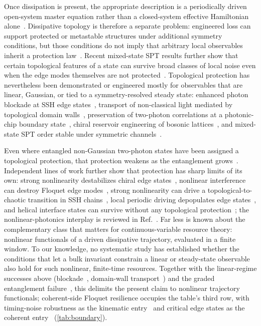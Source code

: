 \documentclass[aps,pra,preprint,superscriptaddress,amsmath,amssymb]{revtex4-2}
\begin{document}
Once dissipation is present, the appropriate description is a periodically driven open-system master equation rather than a closed-system effective Hamiltonian alone~\cite{Mori2023,Chen2024}. Dissipative topology is therefore a separate problem: engineered loss can support protected or metastable structures under additional symmetry conditions, but those conditions do not imply that arbitrary local observables inherit a protection law~\cite{Diehl2011,Bardyn2013,Paszko2024}. Recent mixed-state SPT results further show that certain topological features of a state can survive broad classes of local noise even when the edge modes themselves are not protected~\cite{Paszko2024,Chirame2025}. Topological protection has nevertheless been demonstrated or engineered mostly for observables that are linear, Gaussian, or tied to a symmetry-resolved steady state: enhanced photon blockade at SSH edge states~\cite{Li2024photonblockade}, transport of non-classical light mediated by topological domain walls~\cite{Perez2024domainwalls}, preservation of two-photon correlations at a photonic-chip boundary state~\cite{Wang2019Optica}, chiral reservoir engineering of bosonic lattices~\cite{YanayClerk2018}, and mixed-state SPT order stable under symmetric channels~\cite{Chirame2025}.

Even where entangled non-Gaussian two-photon states have been assigned a topological protection, that protection weakens as the entanglement grows~\cite{Tschernig2021}. Independent lines of work further show that protection has sharp limits of its own: strong nonlinearity destabilizes chiral edge states~\cite{Chaunsali2021}, nonlinear interference can destroy Floquet edge modes~\cite{Michen2023}, strong nonlinearity can drive a topological-to-chaotic transition in SSH chains~\cite{Sone2025chaotic}, local periodic driving depopulates edge states~\cite{Fedorova2019}, and helical interface states can survive without any topological protection~\cite{Xu2023}; the nonlinear-photonics interplay is reviewed in Ref.~\cite{Smirnova2020}. Far less is known about the complementary class that matters for continuous-variable resource theory: nonlinear functionals of a driven dissipative trajectory, evaluated in a finite window. To our knowledge, no systematic study has established whether the conditions that let a bulk invariant constrain a linear or steady-state observable also hold for such nonlinear, finite-time resources. Together with the linear-regime successes above (blockade~\cite{Li2024photonblockade}, domain-wall transport~\cite{Perez2024domainwalls}) and the graded entanglement failure~\cite{Tschernig2021}, this delimits the present claim to nonlinear trajectory functionals; coherent-side Floquet resilience occupies the table's third row, with timing-noise robustness as the kinematic entry~\cite{Bhargava2025} and critical edge states as the coherent entry~\cite{Zhou2025Floquet} (\cref{tab:boundary}).
\end{document}
